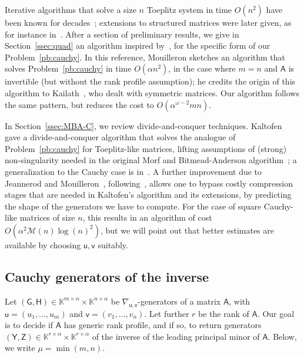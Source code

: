 \documentclass[sigconf]{acmart}
\newcommand{\vu}{\ensuremath{\mathsf{u}}}
\newcommand{\vv}{\ensuremath{\mathsf{v}}}
\newcommand{\mA}{\ensuremath{\mathsf{A}}}
\newcommand{\mG}{\ensuremath{\mathsf{G}}}
\newcommand{\mH}{\ensuremath{\mathsf{H}}}
\newcommand{\mY}{\ensuremath{\mathsf{Y}}}
\newcommand{\mZ}{\ensuremath{\mathsf{Z}}}
\newcommand{\K}{\ensuremath{\mathbb{K}}}
\newcommand{\M}{\ensuremath{\mathscr{M}}}
\newcommand{\mn}{\ensuremath{\mu}}
\theoremstyle{acmdefinition}
\begin{document}
Iterative algorithms that solve a size $n$ Toeplitz system in time
$O(n^2)$ have been known for
decades~\cite{Levinson47,Durbin60,Trench64}; extensions to structured
matrices were later given, as for instance in~\cite{KaGoOl95}. After a
section of preliminary results, we give in Section~\ref{ssec:quad} an
algorithm inspired by~\cite[Algorithme~4]{Mouilleron08}, for the
specific form of our Problem~\ref{pb:cauchy}. In this reference,
Mouilleron sketches an algorithm that solves Problem~\ref{pb:cauchy}
in time $O(\alpha n^2)$, in the case where $m=n$ and $\mA$ is
invertible (but without the rank profile assumption); he credits the
origin of this algorithm to Kailath~\cite[\S1.10]{KaSa99}, who dealt
with symmetric matrices.  Our algorithm follows the same pattern, but
reduces the cost to $O(\alpha^{\omega-2} mn)$.

In Section~\ref{ssec:MBA-C}, we review divide-and-conquer
techniques. Kalt\-ofen~\cite{Kaltofen94} gave a divide-and-conquer
algorithm that solves the analogue of Problem~\ref{pb:cauchy} for
Toeplitz-like matrices, lifting assumptions of (strong)
non-singularity needed in the original Morf and Bitmead-Anderson
algorithm~\cite{Morf80,BiAn80}; a generalization to the Cauchy case is
in~\cite{PaZh00,Cardinal99}.  A further improvement due to Jeannerod
and Mouilleron~\cite{JeMo10}, following~\cite{Cardinal99}, allows one
to bypass costly compression stages that are needed in Kaltofen's
algorithm and its extensions, by predicting the shape of the
generators we have to compute. For the case of square Cauchy-like
matrices of size $n$, this results in an algorithm of cost
$O(\alpha^2 \M(n)\log(n)^2)$, but we will point out that 
better estimates are available by choosing
$\vu,\vv$ suitably.


\vspace{-5px}
\subsection{Cauchy generators of the inverse}\label{ssec:genofinv}

Let $(\mG,\mH) \in \K^{m\times \alpha} \times \K^{n\times \alpha}$ be
$\nabla_{\vu,\vv}$-generators of a matrix $\mA$, with
$\vu=(u_1,\dots,u_m)$ and $\vv=(v_1,\dots,v_n)$. Let further $r$ be
the rank of $\mA$. Our goal is to decide if $\mA$ has generic rank
profile, and if so, to return generators
$(\mY,\mZ) \in \K^{r\times \alpha} \times \K^{r\times \alpha}$ of the
inverse of the leading principal minor of $\mA$.  Below, we write
$\mn=\min(m,n)$.
\end{document}
